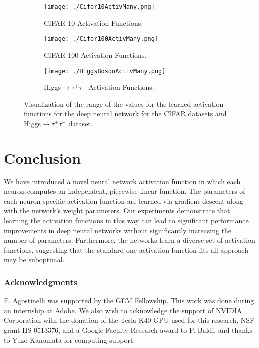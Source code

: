 \documentclass{article} \usepackage{iclr2015,times}
\begin{document}
\begin{figure}[h]
\begin{subfigure}[h]{0.5\textwidth}
\center
\texttt{[image: ./Cifar10ActivMany.png]}
\caption{CIFAR-10 Activation Functions.}
\label{fig:Cifar10ActivFunction}
\end{subfigure}
\begin{subfigure}[h]{0.5\textwidth}
\center
\texttt{[image: ./Cifar100ActivMany.png]}
\caption{CIFAR-100 Activation Functions.}
\label{fig:Cifar100ActivFunction}
\end{subfigure}
\begin{subfigure}[h]{0.5\textwidth}
\center
\texttt{[image: ./HiggsBosonActivMany.png]}
\caption{Higgs$\rightarrow\tau^+\tau^-$ Activation Functions.}
\label{fig:HiggsBosonActivFunction}
\end{subfigure}
\caption{Visualization of the range of the values for the learned activation functions for the deep neural network for the CIFAR datasets and Higgs$\rightarrow\tau^+\tau^-$ dataset.}
\label{fig:activfunction}
\end{figure}





 
\section{Conclusion}
We have introduced a novel neural network activation function in which each neuron computes an independent, piecewise linear function. The parameters of each neuron-specific activation function are learned via gradient descent along with the network's weight parameters. Our experiments demonstrate that learning the activation functions in this way can lead to significant performance improvements in deep neural networks without significantly increasing the number of parameters. Furthermore, the networks learn a diverse set of activation functions, suggesting that the standard one-activation-function-fits-all approach may be suboptimal. 

\subsubsection*{Acknowledgments}
F. Agostinelli was supported by the GEM Fellowship. This work was done during an internship at Adobe. We also wish to acknowledge the support of NVIDIA Corporation with the donation of the Tesla K40 GPU used for this research, NSF grant IIS-0513376, and a Google Faculty Research award to P. Baldi, and thanks to Yuzo Kanomata for computing support.
 


\end{document}
